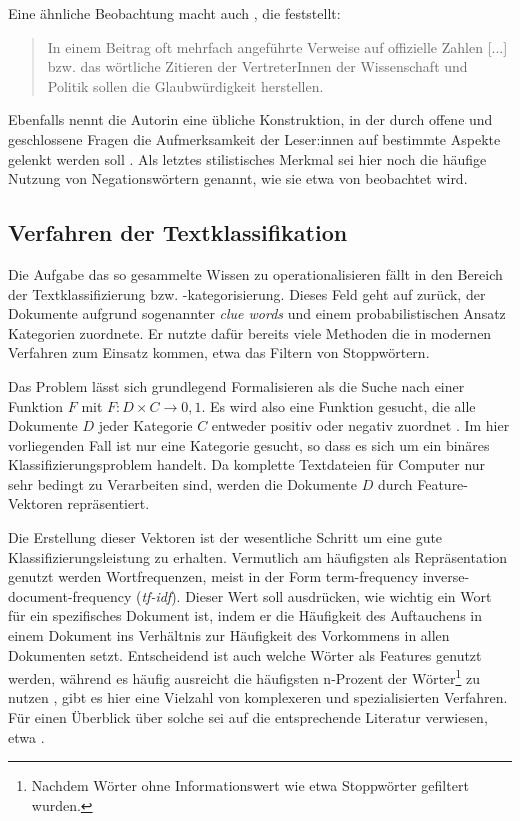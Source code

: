 Eine ähnliche Beobachtung macht auch \textcite{filatkina_2018}, die feststellt:

\begin{quotation}
    In einem Beitrag oft mehrfach angeführte Verweise auf offizielle Zahlen [...] bzw. das wörtliche Zitieren der VertreterInnen der Wissenschaft und Politik sollen die Glaubwürdigkeit herstellen. \parencite[][208]{filatkina_2018}
\end{quotation}

Ebenfalls nennt die Autorin eine übliche Konstruktion, in der durch offene und geschlossene Fragen die Aufmerksamkeit der Leser:innen auf bestimmte Aspekte gelenkt werden soll \parencite[][205]{filatkina_2018}.
Als letztes stilistisches Merkmal sei hier noch die häufige Nutzung von Negationswörtern genannt, wie sie etwa von \textcite[149]{stumpf_2019} beobachtet wird.

\subsection{Verfahren der Textklassifikation}

Die Aufgabe das so gesammelte Wissen zu operationalisieren fällt in den Bereich der Textklassifizierung bzw. -kategorisierung.
Dieses Feld geht auf \textcite{maron_1961} zurück, der Dokumente aufgrund sogenannter \textit{clue words} und einem probabilistischen Ansatz Kategorien zuordnete.
Er nutzte dafür bereits viele Methoden die in modernen Verfahren zum Einsatz kommen, etwa das Filtern von Stoppwörtern.

Das Problem lässt sich grundlegend Formalisieren als die Suche nach einer Funktion $F$ mit $F : D \times C \rightarrow {0, 1}$.
Es wird also eine Funktion gesucht, die alle Dokumente $D$ jeder Kategorie $C$ entweder positiv oder negativ zuordnet \parencite[][66f]{feldman_sanger_2006}.
Im hier vorliegenden Fall ist nur eine Kategorie gesucht, so dass es sich um ein binäres Klassifizierungsproblem handelt.
Da komplette Textdateien für Computer nur sehr bedingt zu Verarbeiten sind, werden die Dokumente $D$ durch Feature-Vektoren repräsentiert.

Die Erstellung dieser Vektoren ist der wesentliche Schritt um eine gute Klassifizierungsleistung zu erhalten.
Vermutlich am häufigsten als Repräsentation genutzt werden Wortfrequenzen, meist in der Form term-frequency inverse-document-frequency (\textit{tf-idf}).
Dieser Wert soll ausdrücken, wie wichtig ein Wort für ein spezifisches Dokument ist, indem er die Häufigkeit des Auftauchens in einem Dokument ins Verhältnis zur Häufigkeit des Vorkommens in allen Dokumenten setzt.
Entscheidend ist auch welche Wörter als Features genutzt werden, während es häufig ausreicht die häufigsten n-Prozent der Wörter\footnote{Nachdem Wörter ohne Informationswert wie etwa Stoppwörter gefiltert wurden.} zu nutzen \parencite[][68]{feldman_sanger_2006}, gibt es hier eine Vielzahl von komplexeren und spezialisierten Verfahren.
Für einen Überblick über solche sei auf die entsprechende Literatur verwiesen, etwa \textcite{yang_1997}.

